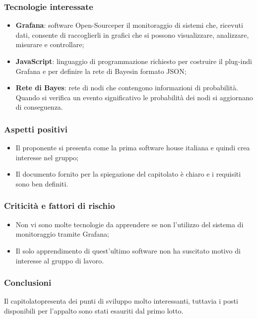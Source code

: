 \subsubsection{Tecnologie interessate}
\begin{itemize}
	\item \textbf{Grafana\glosp}: software Open-Source\glosp per il monitoraggio di sistemi che, ricevuti dati, consente di raccoglierli in grafici che si possono visualizzare, analizzare, misurare e controllare; 
	\item \textbf{JavaScript}: linguaggio di programmazione richiesto per costruire il plug-in\glosp di Grafana e per definire la rete di Bayes\glosp in formato JSON\glo;
	\item \textbf{Rete di Bayes}: rete di nodi che contengono informazioni di probabilità. Quando si verifica un evento significativo le probabilità dei nodi si aggiornano di conseguenza.
\end{itemize}
\subsubsection{Aspetti positivi}
\begin{itemize}
	\item Il proponente si presenta come la prima software house italiana e quindi crea interesse nel gruppo;
	\item Il documento fornito per la spiegazione del capitolato è chiaro e i requisiti sono ben definiti.
\end{itemize}
\subsubsection{Criticità e fattori di rischio}
\begin{itemize}
	\item Non vi sono molte tecnologie da apprendere se non l'utilizzo del sistema di monitoraggio tramite Grafana\glo;
	\item Il solo apprendimento di quest'ultimo software non ha suscitato motivo di interesse al gruppo di lavoro.
\end{itemize}
\subsubsection{Conclusioni}
Il capitolato\glosp presenta dei punti di sviluppo molto interessanti, tuttavia i posti disponibili per l'appalto sono stati esauriti dal primo lotto.